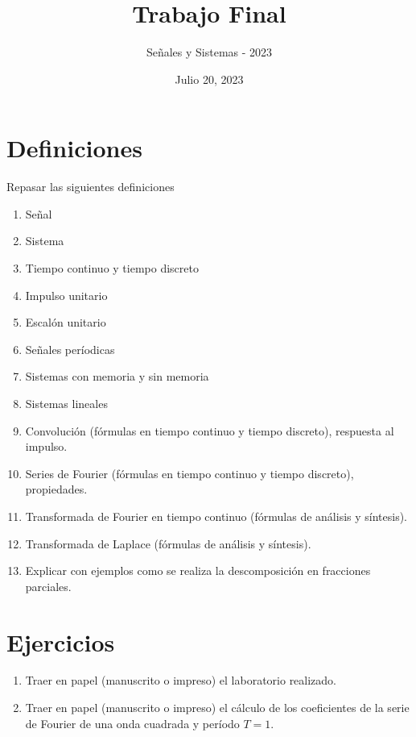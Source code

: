 \documentclass[10pt,a4paper]{article}
\author{Señales y Sistemas - 2023}
\title{Trabajo Final}
\date{Julio 20, 2023}
\begin{document}
	\maketitle
	\section{Definiciones}
	Repasar las siguientes definiciones
	\begin{enumerate}
		\item Señal
		\item Sistema
		\item Tiempo continuo y tiempo discreto
		\item Impulso unitario
		\item Escalón unitario
		\item Señales períodicas
		\item Sistemas con memoria y sin memoria
		\item Sistemas lineales
		\item Convolución (fórmulas en tiempo continuo y tiempo discreto), respuesta al impulso.
		\item Series de Fourier (fórmulas en tiempo continuo y tiempo discreto), propiedades.
		\item Transformada de Fourier en tiempo continuo (fórmulas de análisis y síntesis).
		\item Transformada de Laplace (fórmulas de análisis y síntesis).
		\item Explicar con ejemplos como se realiza la descomposición en fracciones parciales.
	\end{enumerate}

    \section{Ejercicios}
    \begin{enumerate}
    	\item Traer en papel (manuscrito o impreso) el laboratorio realizado.
    	\item Traer en papel (manuscrito o impreso) el cálculo de los coeficientes de la serie de Fourier de una onda cuadrada y período $T = 1$.
    \end{enumerate}
\end{document}
